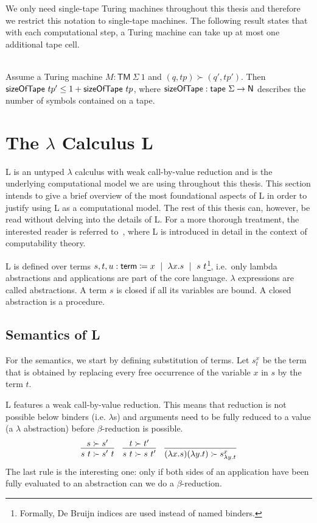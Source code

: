 We only need single-tape Turing machines throughout this thesis and therefore we restrict this notation to single-tape machines.
The following result states that with each computational step, a Turing machine can take up at most one additional tape cell. 
\begin{lemma}\label{lem:time_bounds_space}~\\
  Assume a Turing machine $M : \textsf{TM}~\Sigma~1$ and $(q, tp) \succ (q', tp')$. Then $\textsf{sizeOfTape}~tp' \le 1 +{\textsf{sizeOfTape}~tp}$, 
  where $\textsf{sizeOfTape} : \textsf{tape}~\Sigma \rightarrow \mathsf{N}$ describes the number of symbols contained on a tape.
\end{lemma}

\newcommand{\Lterm}{\textsf{term}}
\section{The $\lambda$ Calculus L}
L is an untyped $\lambda$ calculus with weak call-by-value reduction and is the underlying computational model we are using throughout this thesis. 
This section intends to give a brief overview of the most foundational aspects of L in order to justify using L as a computational model. The rest of this thesis can, however, be read without delving into the details of L. 
For a more thorough treatment, the interested reader is referred to~\cite{ForsterSmolka:2017:L-Computability}, where L is introduced in detail in the context of computability theory.

L is defined over terms $s, t, u: \Lterm \defeq x \bnfmid \lambda x. s \bnfmid s~t$\footnote{Formally, De Bruijn indices are used instead of named binders.}, i.e.\ only lambda abstractions and applications are part of the core language. $\lambda$ expressions are called abstractions. A term $s$ is closed if all its variables are bound. A closed abstraction is a procedure.

\subsection{Semantics of L}
For the semantics, we start by defining substitution of terms. Let $s^x_t$ be the term that is obtained by replacing every free occurrence of the variable $x$ in $s$ by the term $t$. 

L features a weak call-by-value reduction. This means that reduction is not possible below binders (i.e. $\lambda$s) and arguments need to be fully reduced to a value (a $\lambda$ abstraction) before $\beta$-reduction is possible.
\begin{align*}
  \infer{s~t \succ s'~t}{s \succ s'} \quad \infer{s~t \succ s~t'}{t \succ t'} \quad \infer{(\lambda x.s)(\lambda y.t) \succ s^x_{\lambda y. t}}{} 
\end{align*}
The last rule is the interesting one: only if both sides of an application have been fully evaluated to an abstraction can we do a $\beta$-reduction. 

